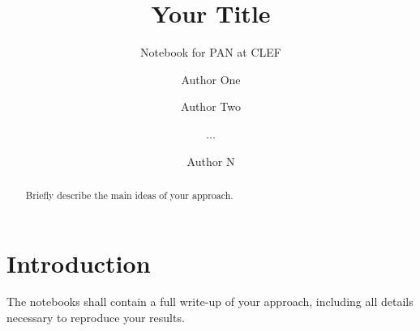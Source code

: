 \documentclass{llncs}
\begin{document}
\title{Your Title}
\subtitle{Notebook for PAN at CLEF \the\year}

\author{Author One \and Author Two \and ... \and Author N}

\maketitle

\begin{abstract}
Briefly describe the main ideas of your approach.
\end{abstract}


\section{Introduction}

The notebooks shall contain a full write-up of your approach, including all details necessary to reproduce your results.




\begin{raggedright}

\end{raggedright}
\end{document}
